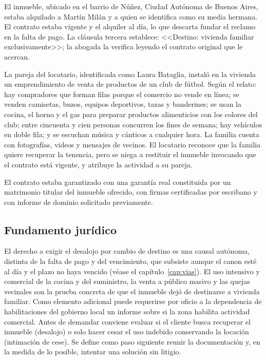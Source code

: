 \documentclass[12pt,oneside]{book}
\begin{document}
El inmueble, ubicado en el barrio de Núñez, Ciudad Autónoma de Buenos Aires, estaba alquilado a Martín Milán y a quien se identifica como su media hermana. El contrato estaba vigente y el alquiler al día, lo que descarta fundar el reclamo en la falta de pago. La cláusula tercera establece: <<Destino: vivienda familiar exclusivamente>>; la abogada la verifica leyendo el contrato original que le acercan.

La pareja del locatario, identificada como Laura Bataglia, instaló en la vivienda un emprendimiento de venta de productos de un club de fútbol. Según el relato: hay compradores que forman filas porque el comercio no vende en línea; se venden camisetas, buzos, equipos deportivos, tazas y banderines; se usan la cocina, el horno y el gas para preparar productos alimenticios con los colores del club; entre cincuenta y cien personas concurren los fines de semana; hay vehículos en doble fila; y se escuchan música y cánticos a cualquier hora. La familia cuenta con fotografías, videos y mensajes de vecinos. El locatario reconoce que la familia quiere recuperar la tenencia, pero se niega a restituir el inmueble invocando que el contrato está vigente, y atribuye la actividad a su pareja.

El contrato estaba garantizado con una garantía real constituida por un matrimonio titular del inmueble ofrecido, con firmas certificadas por escribano y con informe de dominio solicitado previamente.

\subsection{Fundamento jurídico}

El derecho a exigir el desalojo por cambio de destino es una causal autónoma, distinta de la falta de pago y del vencimiento, que subsiste aunque el canon esté al día y el plazo no haya vencido (véase el capítulo~\ref{cap:vias}). El uso intensivo y comercial de la cocina y del suministro, la venta a público masivo y las quejas vecinales son la prueba concreta de que el inmueble dejó de destinarse a vivienda familiar. Como elemento adicional puede requerirse por oficio a la dependencia de habilitaciones del gobierno local un informe sobre si la zona habilita actividad comercial. Antes de demandar conviene evaluar si el cliente busca recuperar el inmueble (desalojo) o solo hacer cesar el uso indebido conservando la locación (intimación de cese). Se define como paso siguiente reunir la documentación y, en la medida de lo posible, intentar una solución sin litigio.
\end{document}
